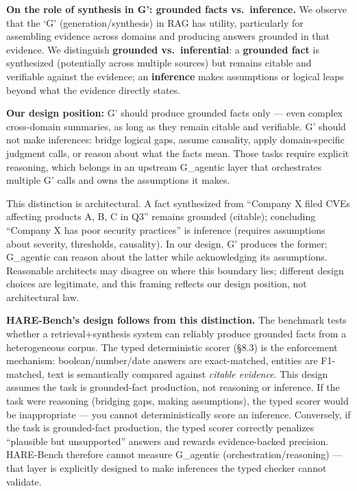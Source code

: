 \textbf{On the role of synthesis in G': grounded facts vs.~inference.} We observe that the `G' (generation/synthesis) in RAG has utility, particularly for assembling evidence across domains and producing answers grounded in that evidence. We distinguish \textbf{grounded vs.~inferential}: a \textbf{grounded fact} is synthesized (potentially across multiple sources) but remains citable and verifiable against the evidence; an \textbf{inference} makes assumptions or logical leaps beyond what the evidence directly states.

\textbf{Our design position:} G' should produce grounded facts only --- even complex cross-domain summaries, as long as they remain citable and verifiable. G' should not make inferences: bridge logical gaps, assume causality, apply domain-specific judgment calls, or reason about what the facts mean. Those tasks require explicit reasoning, which belongs in an upstream G\_agentic layer that orchestrates multiple G' calls and owns the assumptions it makes.

This distinction is architectural. A fact synthesized from ``Company X filed CVEs affecting products A, B, C in Q3'' remains grounded (citable); concluding ``Company X has poor security practices'' is inference (requires assumptions about severity, thresholds, causality). In our design, G' produces the former; G\_agentic can reason about the latter while acknowledging its assumptions. Reasonable architects may disagree on where this boundary lies; different design choices are legitimate, and this framing reflects our design position, not architectural law.

\textbf{HARE-Bench's design follows from this distinction.} The benchmark tests whether a retrieval+synthesis system can reliably produce grounded facts from a heterogeneous corpus. The typed deterministic scorer (§8.3) is the enforcement mechanism: boolean/number/date answers are exact-matched, entities are F1-matched, text is semantically compared against \emph{citable evidence}. This design assumes the task is grounded-fact production, not reasoning or inference. If the task were reasoning (bridging gaps, making assumptions), the typed scorer would be inappropriate --- you cannot deterministically score an inference. Conversely, if the task is grounded-fact production, the typed scorer correctly penalizes ``plausible but unsupported'' answers and rewards evidence-backed precision. HARE-Bench therefore cannot measure G\_agentic (orchestration/reasoning) --- that layer is explicitly designed to make inferences the typed checker cannot validate.

